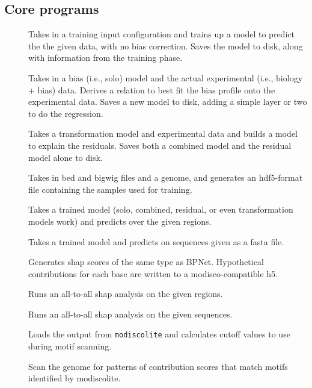 \documentclass{article}
\begin{document}
\subsection{Core programs}

\begin{description}
    \item [] Takes in a training input configuration and trains up a model to
        predict the the given data, with no bias correction. Saves the model to disk, along with
        information from the training phase.
    \item [] Takes in a bias (i.e., solo) model and the actual
        experimental (i.e., biology + bias) data. Derives a relation to best fit the bias profile
        onto the experimental data. Saves a new model to disk, adding a simple layer or two to
        do the regression.
    \item [] Takes a transformation model and experimental data and builds
        a model to explain the residuals. Saves both a combined model and the residual model
        alone to disk.
    \item [] Takes in bed and bigwig files and a genome, and generates an
        hdf5-format file containing the samples used for training.
    \item [] Takes a trained model (solo, combined, residual, or even
        transformation models work) and predicts over the given regions.
    \item [] Takes a trained model and predicts on sequences given as
        a fasta file.
    \item [] Generates shap scores of the same type as BPNet. Hypothetical
        contributions for each base are written to a modisco-compatible h5.
    \item [] Runs an all-to-all shap analysis on the given regions.
    \item [] Runs an all-to-all shap analysis on the given sequences.
    \item [] Loads the output from \texttt{modiscolite} and calculates cutoff values
        to use during motif scanning.
    \item [] Scan the genome for patterns of contribution scores that match motifs
        identified by modiscolite.
\end{description}
\end{document}
